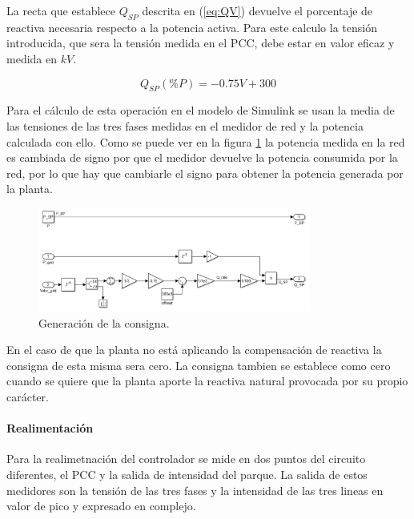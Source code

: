 \documentclass{book}
\begin{document}
La recta que establece $Q_{SP}$ descrita en (\ref{eq:QV}) devuelve el porcentaje de reactiva necesaria respecto a la potencia activa. Para este calculo la tensi\'on introducida, que sera la tensi\'on medida en el PCC, debe estar en valor eficaz y medida en $kV$.  

\begin{equation}\label{eq:QV}
	Q_{SP}(\%P)= -0.75V +300 
\end{equation} \par

Para el c\'alculo de esta operaci\'on en el modelo de Simulink se usan la media de las tensiones de las tres fases medidas en el medidor de red y la potencia calculada con ello. Como se puede ver en la figura \ref{SP_Sim} la potencia medida en la red es cambiada de signo por que el medidor devuelve la potencia consumida por la red, por lo que hay que cambiarle el signo para obtener la potencia generada por la planta. 

\begin{figure}[h!]
\centering
\includegraphics[width=0.8\textwidth]{SP_Sim.PNG}
\caption{Generaci\'on de la consigna. }
\label{SP_Sim}
\end{figure} \par

En el caso de que la planta no est\'a aplicando la compensaci\'on de reactiva la consigna de esta misma sera cero. La consigna tambien se establece como cero cuando se quiere que la planta aporte la reactiva natural provocada por su propio car\'acter. \par

\paragraph{Realimentaci\'on}

Para la realimetnaci\'on del controlador se mide en dos puntos del circuito diferentes, el PCC y la salida de intensidad del parque. La salida de estos medidores son la tensi\'on de las tres fases y la intensidad de las tres lineas en valor de pico y expresado en complejo. \par
\end{document}
